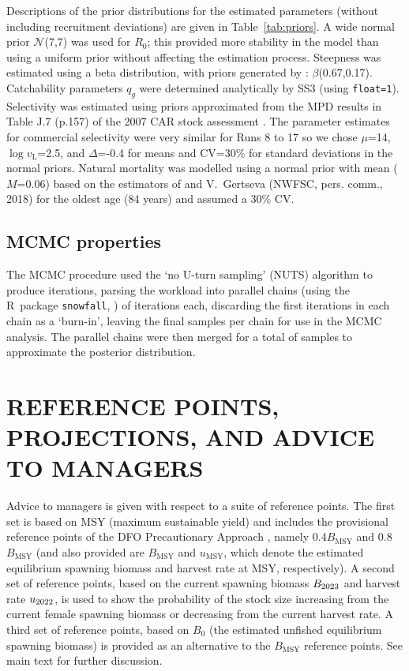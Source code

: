 \documentclass[11pt]{book}
\newcommand{\Norm}{\mathcal{N}}%
\newcommand{\Bmsy}{B_\text{MSY}}
\newcommand{\umsy}{u_\text{MSY}}
\newcommand{\pc}{\%}
\newcommand{\code}[1]{\normalsize\texttt{#1}\normalsize}%
\begin{document}
Descriptions of the prior distributions for the estimated parameters (without including recruitment deviations) are given in Table~\ref{tab:priors}.
A wide normal prior $\Norm$(7,7) was used for $R_0$; this provided more stability in the model than using a uniform prior without affecting the estimation process.
Steepness was estimated using a beta distribution, with priors generated by \citet{Forrest-etal:2010}: $\beta$(0.67,0.17).
Catchability parameters $q_g$ were determined analytically by SS3 (using \code{float=1}).
Selectivity was estimated using priors approximated from the MPD results in Table J.7 (p.157) of the 2007 CAR stock assessment \citep{Stanley-etal:2009_car}.
The parameter estimates for commercial selectivity were very similar for Runs 8 to 17 so we chose $\mu$=14, $\log v_\text{L}$=2.5, and $\Delta$=-0.4 for means and CV=30\pc{} for standard deviations in the normal priors.
Natural mortality was modelled using a normal prior with mean ($M$=0.06) based on the estimators of \citet{Hoenig:1983} and V.~Gertseva (NWFSC, pers. comm., 2018) for the oldest age (84 years) and assumed a 30\pc{} CV.

\subsection{MCMC properties}

The MCMC procedure used the `no U-turn sampling' (NUTS) algorithm \citep{Monnahan-Kristensen:2018, Monnahan-etal:2019} to produce \nSims{} iterations, parsing the workload into \nChains{} parallel chains (using the R~package \code{snowfall}, \citealt{R:2015_snowfall}) of \cSims{} iterations each, discarding the first \cBurn{} iterations in each chain as a `burn-in', leaving the final \cSamps{} samples per chain for use in the MCMC analysis.
The parallel chains were then merged for a total of \Nmcmc{} samples to approximate the posterior distribution.

\section{REFERENCE POINTS, PROJECTIONS, AND ADVICE TO MANAGERS}

Advice to managers is given with respect to a suite of reference points.
The first set is based on MSY (maximum sustainable yield) and includes the provisional reference points of the DFO Precautionary Approach \citep{DFO-SAR:2006_pa}, namely 0.4$\Bmsy$ and 0.8$\Bmsy$ (and also provided are $\Bmsy$ and $\umsy$, which denote the estimated equilibrium spawning biomass and harvest rate at MSY, respectively). 
A second set of reference points, based on the current spawning biomass $B_{2023}$ and harvest rate $u_{2022}$, is used to show the probability of the stock size increasing from the current female spawning biomass or decreasing from the current harvest rate.
A third set of reference points, based on $B_0$ (the estimated unfished equilibrium spawning biomass) is provided as an alternative to the $\Bmsy$ reference points.
See main text for further discussion.
\end{document}
